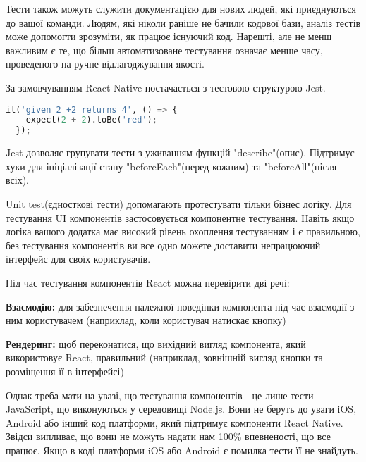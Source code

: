 Тести також можуть служити документацією для нових людей, які приєднуються до вашої команди.
Людям, які ніколи раніше не бачили кодової бази, аналіз тестів може допомогти зрозуміти, як працює існуючий код.
Нарешті, але не менш важливим є те, що більш автоматизоване тестування означає менше часу, проведеного на
ручне відлагоджування якості.

За замовчуванням React Native постачається з тестовою структурою Jest. \cite{jest_home_page}

\begin{lstlisting}[style=light, language=Python,label={lst:rn_jest_test},caption=Jest Unit Test]
  it('given 2 +2 returns 4', () => {
    expect(2 + 2).toBe('red');
  });
\end{lstlisting}

Jest дозволяє групувати тести з уживанням функцій "describe"(опис).
Підтримує хуки для ініціалізації стану "beforeEach"(перед кожним) та "beforeAll"(після всіх).

Unit test(єдносткові тести) допомагають протестувати тільки бізнес логіку.
Для тестування UI компонентів застосовується компонентне тестування.
Навіть якщо логіка вашого додатка має високий рівень охоплення тестуванням і є правильною,
без тестування компонентів ви все одно можете доставити непрацюючий інтерфейс для своїх користувачів.

Під час тестування компонентів React можна перевірити дві речі:

\begin{itemize}
    \begin{item}
        \textbf{Взаємодію:} для забезпечення належної поведінки компонента під час взаємодії з ним користувачем (наприклад, коли користувач натискає кнопку)
    \end{item}
    \begin{item}
        \textbf{Рендеринг:} щоб переконатися, що вихідний вигляд компонента, який використовує React, правильний (наприклад, зовнішній вигляд кнопки та розміщення її в інтерфейсі)
    \end{item}
\end{itemize}

Однак треба мати на увазі, що тестування компонентів - це лише тести JavaScript, що виконуються у середовищі Node.js.
Вони не беруть до уваги iOS, Android або інший код платформи, який підтримує компоненти React Native.
Звідси випливає, що вони не можуть надати нам 100\% впевненості, що все працює.
Якщо в коді платформи iOS або Android є помилка тести її не знайдуть.

